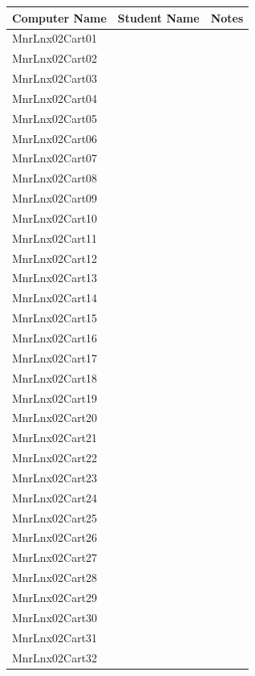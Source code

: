 \begin{tabular}{| l | p{7cm} | p{5cm} |}
        \hline
        \textbf{Computer Name} & \textbf{Student Name} & \textbf{Notes}\\ \hline
        MnrLnx02Cart01 & & \\ \hline
        MnrLnx02Cart02 & & \\ \hline
        MnrLnx02Cart03 & & \\ \hline
        MnrLnx02Cart04 & & \\ \hline
        MnrLnx02Cart05 & & \\ \hline
        MnrLnx02Cart06 & & \\ \hline
        MnrLnx02Cart07 & & \\ \hline
        MnrLnx02Cart08 & & \\ \hline
        MnrLnx02Cart09 & & \\ \hline
        MnrLnx02Cart10 & & \\ \hline
        MnrLnx02Cart11 & & \\ \hline
        MnrLnx02Cart12 & & \\ \hline
        MnrLnx02Cart13 & & \\ \hline
        MnrLnx02Cart14 & & \\ \hline
        MnrLnx02Cart15 & & \\ \hline
        MnrLnx02Cart16 & & \\ \hline
        MnrLnx02Cart17 & & \\ \hline
        MnrLnx02Cart18 & & \\ \hline
        MnrLnx02Cart19 & & \\ \hline
        MnrLnx02Cart20 & & \\ \hline
        MnrLnx02Cart21 & & \\ \hline
        MnrLnx02Cart22 & & \\ \hline
        MnrLnx02Cart23 & & \\ \hline
        MnrLnx02Cart24 & & \\ \hline
        MnrLnx02Cart25 & & \\ \hline
        MnrLnx02Cart26 & & \\ \hline
        MnrLnx02Cart27 & & \\ \hline
        MnrLnx02Cart28 & & \\ \hline
        MnrLnx02Cart29 & & \\ \hline
        MnrLnx02Cart30 & & \\ \hline
        MnrLnx02Cart31 & & \\ \hline
        MnrLnx02Cart32 & & \\ \hline
\end{tabular}
